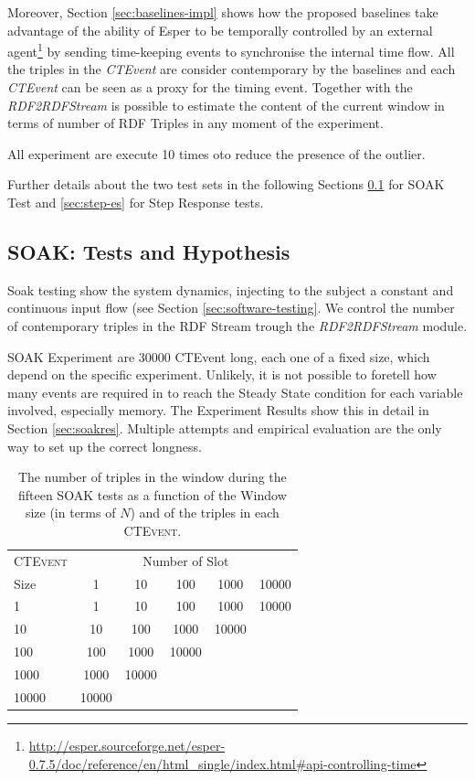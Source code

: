 Moreover, Section \ref{sec:baselines-impl} shows how the proposed baselines take advantage of the ability of Esper to be temporally controlled by an external agent\footnote{\url{http://esper.sourceforge.net/esper-0.7.5/doc/reference/en/html_single/index.html#api-controlling-time}} by sending time-keeping events to synchronise the internal time flow. All the triples in the \textit{CTEvent} are consider contemporary by the baselines and each \textit{CTEvent} can be seen as a proxy for the timing event. Together with the \textit{RDF2RDFStream} is possible to estimate the content of the current window in terms of number of RDF Triples in any moment of the experiment.

All experiment are execute 10 times oto reduce the presence of the outlier.

Further details about the two test sets in the following Sections \ref{sec:soak-es} for SOAK Test and \ref{sec:step-es} for Step Response tests.

\subsection{SOAK: Tests and Hypothesis}\label{sec:soak-es}

Soak testing show the system dynamics, injecting to the subject a constant and continuous input flow (see Section \ref{sec:software-testing}.  We control the number of contemporary triples in the RDF Stream trough the \textit{RDF2RDFStream} module. %

SOAK Experiment are 30000 CTEvent long, each one of a fixed size, which depend on the specific experiment. Unlikely, it is not possible to foretell how many events are required in to reach the Steady State condition for each variable involved, especially memory. The Experiment Results show this in detail in Section \ref{sec:soakres}. Multiple attempts and empirical evaluation are the only way to set up the correct longness.

\begin{table}[htb]
\centering
\normalsize
 \begin{tabular}{l| ccccc}
	  	\hline
		\textsc{CTEvent}  &\multicolumn{5}{c}{Number of Slot}  \\
		Size  & 1 & 10 & 100 & 1000&10000 \\
		\hline	
		1 & 1& 10 & 100 & 1000&10000 \\
		10  & 10 & 100 & 1000&10000 \\
		100 & 100&1000&10000  \\
		1000 &1000 & 10000 \\
		10000&10000  \\
		\hline 
	\end{tabular}
	
	 \vspace{10pt}
	\caption{The number of triples in the window during the fifteen SOAK tests as a function of the Window size (in terms of $N$) and of the triples in each \textsc{CTEvent}.}
	\label{tab:soaktests}
\end{table}

